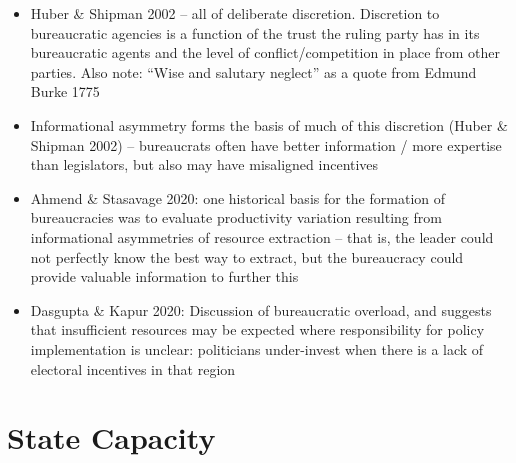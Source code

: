 \documentclass[12pt]{article}
\begin{document}
\begin{itemize}
    \item Huber \& Shipman 2002 -- all of deliberate discretion. Discretion to bureaucratic agencies is a function of the trust the ruling party has in its bureaucratic agents and the level of conflict/competition in place from other parties. Also note: ``Wise and salutary neglect'' as a quote from Edmund Burke 1775
    \item Informational asymmetry forms the basis of much of this discretion (Huber \& Shipman 2002) -- bureaucrats often have better information / more expertise than legislators, but also may have misaligned incentives
    \item Ahmend \& Stasavage 2020: one historical basis for the formation of bureaucracies was to evaluate productivity variation resulting from informational asymmetries of resource extraction -- that is, the leader could not perfectly know the best way to extract, but the bureaucracy could provide valuable information to further this
    \item Dasgupta \& Kapur 2020: Discussion of bureaucratic overload, and suggests that insufficient resources may be expected where responsibility for policy implementation is unclear: politicians under-invest when there is a lack of electoral incentives in that region
\end{itemize}



\section*{State Capacity}
\end{document}
